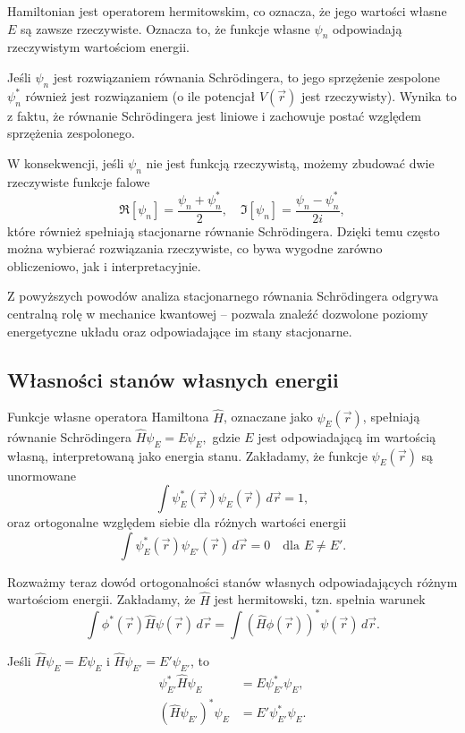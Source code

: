 Hamiltonian jest operatorem hermitowskim, co oznacza, że jego wartości własne $E$ są zawsze rzeczywiste. Oznacza to, że funkcje własne $\psi_n$ odpowiadają rzeczywistym wartościom energii.

Jeśli $\psi_n$ jest rozwiązaniem równania Schrödingera, to jego sprzężenie zespolone $\psi_n^*$ również jest rozwiązaniem (o ile potencjał $V(\vec{r})$ jest rzeczywisty). Wynika to z faktu, że równanie Schrödingera jest liniowe i zachowuje postać względem sprzężenia zespolonego.

W konsekwencji, jeśli $\psi_n$ nie jest funkcją rzeczywistą, możemy zbudować dwie rzeczywiste funkcje falowe
$$
\Re[\psi_n] = \frac{\psi_n + \psi_n^*}{2}, \quad
\Im[\psi_n] = \frac{\psi_n - \psi_n^*}{2i},
$$
które również spełniają stacjonarne równanie Schrödingera. Dzięki temu często można wybierać rozwiązania rzeczywiste, co bywa wygodne zarówno obliczeniowo, jak i interpretacyjnie.

Z powyższych powodów analiza stacjonarnego równania Schrödingera odgrywa centralną rolę w mechanice kwantowej -- pozwala znaleźć dozwolone poziomy energetyczne układu oraz odpowiadające im stany stacjonarne.

\subsection{Własności stanów własnych energii}

Funkcje własne operatora Hamiltona $\hat{H}$, oznaczane jako $\psi_E(\vec{r})$, spełniają równanie Schrödingera $\hat{H} \psi_E = E \psi_E,$ gdzie $E$ jest odpowiadającą im wartością własną, interpretowaną jako energia stanu. Zakładamy, że funkcje $\psi_E(\vec{r})$ są unormowane
$$
\int \psi_E^*(\vec{r}) \psi_E(\vec{r}) \, d\vec{r} = 1,
$$
oraz ortogonalne względem siebie dla różnych wartości energii
$$
\int \psi_E^*(\vec{r}) \psi_{E'}(\vec{r}) \, d\vec{r} = 0
\quad \text{dla } E \ne E'.
$$

Rozważmy teraz dowód ortogonalności stanów własnych odpowiadających różnym wartościom energii. Zakładamy, że $\hat{H}$ jest hermitowski, tzn. spełnia warunek
$$
\int \phi^*(\vec{r}) \hat{H} \psi(\vec{r}) \, d\vec{r}
= \int (\hat{H} \phi(\vec{r}))^* \psi(\vec{r}) \, d\vec{r}.
$$

Jeśli $\hat{H} \psi_E = E \psi_E$ i $\hat{H} \psi_{E'} = E' \psi_{E'}$, to
\begin{align*}
\psi_{E'}^* \hat{H} \psi_E &= E \psi_{E'}^* \psi_E, \\
(\hat{H} \psi_{E'})^* \psi_E &= E' \psi_{E'}^* \psi_E.
\end{align*}

